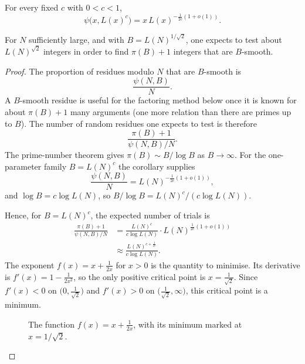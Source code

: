 \begin{corollary}
For every fixed \(c\) with \(0<c<1\),
\[
    \psi\bigl(x,L(x)^{c}\bigr)
    =x\,L(x)^{-\frac1{2c}(1+o(1))}.
\]
\end{corollary}

\begin{theorem}
For \(N\) sufficiently large, and with \(B=L(N)^{1/\sqrt{2}}\), one expects
to test about \(L(N)^{\sqrt{2}}\) integers in order to find \(\pi(B)+1\)
integers that are \(B\)-smooth.
\end{theorem}

\begin{proof}
The proportion of residues modulo \(N\) that are \(B\)-smooth is
\[
    \frac{\psi(N,B)}{N}.
\]
A \(B\)-smooth residue is useful for the factoring method below once it
is known for about \(\pi(B)+1\) many arguments (one more relation than
there are primes up to \(B\)). The number of random residues one expects
to test is therefore
\[
    \frac{\pi(B)+1}{\psi(N,B)/N}.
\]
The prime-number theorem gives \(\pi(B)\sim B/\log B\) as \(B\to\infty\).
For the one-parameter family \(B=L(N)^{c}\) the corollary supplies
\[
    \frac{\psi(N,B)}{N}
    =L(N)^{-\frac1{2c}(1+o(1))},
\]
and \(\log B=c\log L(N)\), so \(B/\log B=L(N)^{c}/(c\log L(N))\).

Hence, for \(B=L(N)^{c}\), the expected number of trials is
\begin{align*}
    \frac{\pi(B)+1}{\psi(N,B)/N}
    &=\frac{L(N)^{c}}{c\log L(N)}
      \cdot L(N)^{\frac1{2c}(1+o(1))}\\
    &\approx\frac{L(N)^{c+\frac1{2c}}}{c\log L(N)}.
\end{align*}
The exponent \(f(x)=x+\frac1{2x}\) for \(x>0\) is the quantity to minimise.
Its derivative is \(f'(x)=1-\frac1{2x^{2}}\), so the only positive critical
point is \(x=\frac1{\sqrt{2}}\). Since \(f'(x)<0\) on \(\bigl(0,\frac1{\sqrt{2}}\bigr)\)
and \(f'(x)>0\) on \(\bigl(\frac1{\sqrt{2}},\infty\bigr)\), this critical point
is a minimum.

\begin{figure}[H]
\centering
{}
\caption{The function \(f(x)=x+\frac1{2x}\), with its minimum marked at
\(x=1/\sqrt{2}\).}
\end{figure}


\end{proof}
